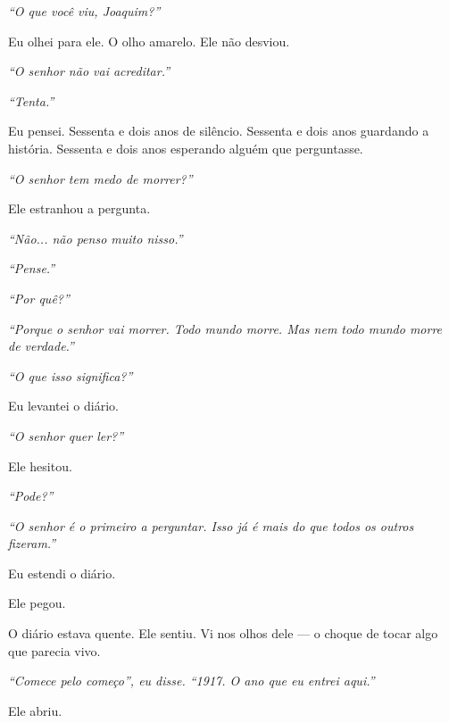 \noindent \textit{\textquotedblleft{}O que você viu, Joaquim?\textquotedblright{}}

\noindent Eu olhei para ele. O olho amarelo. Ele não desviou.

\noindent \textit{\textquotedblleft{}O senhor não vai acreditar.\textquotedblright{}}

\noindent \textit{\textquotedblleft{}Tenta.\textquotedblright{}}

\noindent Eu pensei. Sessenta e dois anos de silêncio. Sessenta e dois anos guardando a história. Sessenta e dois anos esperando alguém que perguntasse.

\noindent \textit{\textquotedblleft{}O senhor tem medo de morrer?\textquotedblright{}}

\noindent Ele estranhou a pergunta.

\noindent \textit{\textquotedblleft{}Não... não penso muito nisso.\textquotedblright{}}

\noindent \textit{\textquotedblleft{}Pense.\textquotedblright{}}

\noindent \textit{\textquotedblleft{}Por quê?\textquotedblright{}}

\noindent \textit{\textquotedblleft{}Porque o senhor vai morrer. Todo mundo morre. Mas nem todo mundo morre de verdade.\textquotedblright{}}

\noindent \textit{\textquotedblleft{}O que isso significa?\textquotedblright{}}

\noindent Eu levantei o diário.

\noindent \textit{\textquotedblleft{}O senhor quer ler?\textquotedblright{}}

\noindent Ele hesitou.

\noindent \textit{\textquotedblleft{}Pode?\textquotedblright{}}

\noindent \textit{\textquotedblleft{}O senhor é o primeiro a perguntar. Isso já é mais do que todos os outros fizeram.\textquotedblright{}}

\noindent Eu estendi o diário.

\noindent Ele pegou.

\noindent O diário estava quente. Ele sentiu. Vi nos olhos dele --- o choque de tocar algo que parecia vivo.

\noindent \textit{\textquotedblleft{}Comece pelo começo\textquotedblright{}\textit{, eu disse. }\textquotedblleft{}1917. O ano que eu entrei aqui.\textquotedblright{}}

\noindent Ele abriu.

